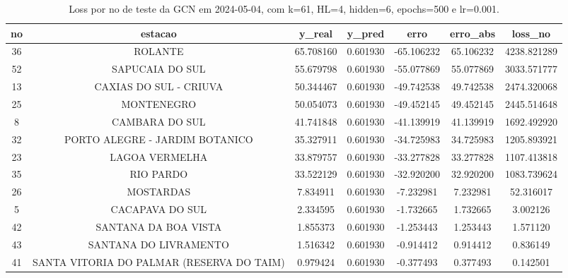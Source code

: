 \begin{table}[h]
\centering
\caption{Loss por no de teste da GCN em 2024-05-04, com k=61, HL=4, hidden=6, epochs=500 e lr=0.001.}
\label{tab:gcn_loss_k61_hl4_h6_e500_d20240504}
\begin{tabular}{ccccccc}
\toprule
no & estacao & y\_real & y\_pred & erro & erro\_abs & loss\_no \\
\midrule
36 & ROLANTE & 65.708160 & 0.601930 & -65.106232 & 65.106232 & 4238.821289 \\
52 & SAPUCAIA DO SUL & 55.679798 & 0.601930 & -55.077869 & 55.077869 & 3033.571777 \\
13 & CAXIAS DO SUL - CRIUVA & 50.344467 & 0.601930 & -49.742538 & 49.742538 & 2474.320068 \\
25 & MONTENEGRO & 50.054073 & 0.601930 & -49.452145 & 49.452145 & 2445.514648 \\
8 & CAMBARA DO SUL & 41.741848 & 0.601930 & -41.139919 & 41.139919 & 1692.492920 \\
32 & PORTO ALEGRE - JARDIM BOTANICO & 35.327911 & 0.601930 & -34.725983 & 34.725983 & 1205.893921 \\
23 & LAGOA VERMELHA & 33.879757 & 0.601930 & -33.277828 & 33.277828 & 1107.413818 \\
35 & RIO PARDO & 33.522129 & 0.601930 & -32.920200 & 32.920200 & 1083.739624 \\
26 & MOSTARDAS & 7.834911 & 0.601930 & -7.232981 & 7.232981 & 52.316017 \\
5 & CACAPAVA DO SUL & 2.334595 & 0.601930 & -1.732665 & 1.732665 & 3.002126 \\
42 & SANTANA DA BOA VISTA & 1.855373 & 0.601930 & -1.253443 & 1.253443 & 1.571120 \\
43 & SANTANA DO LIVRAMENTO & 1.516342 & 0.601930 & -0.914412 & 0.914412 & 0.836149 \\
41 & SANTA VITORIA DO PALMAR (RESERVA DO TAIM) & 0.979424 & 0.601930 & -0.377493 & 0.377493 & 0.142501 \\
\bottomrule
\end{tabular}
\end{table}
